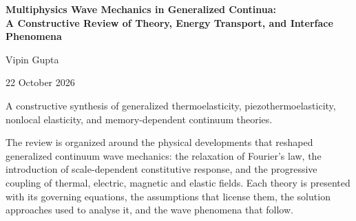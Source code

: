 \begin{titlepage}
\centering
\vspace*{2cm}
{\LARGE\bfseries Multiphysics Wave Mechanics in Generalized Continua:\\[0.3em]
A Constructive Review of Theory, Energy Transport, and Interface Phenomena\par}
\vspace{1.8cm}
{\large Vipin Gupta\par}
\vspace{0.6cm}
{\large 22 October 2026\par}
\vfill
{\small A constructive synthesis of generalized thermoelasticity, piezothermoelasticity, nonlocal elasticity, and memory-dependent continuum theories.\par}
\vspace{0.5cm}
{\small \begin{minipage}{0.85\textwidth}\small
The review is organized around the physical developments that reshaped generalized continuum
wave mechanics: the relaxation of Fourier's law, the introduction of scale-dependent constitutive
response, and the progressive coupling of thermal, electric, magnetic and elastic fields.
Each theory is presented with its governing equations, the assumptions that license them,
the solution approaches used to analyse it, and the wave phenomena that follow.
\par\end{minipage}\par}
\end{titlepage}
